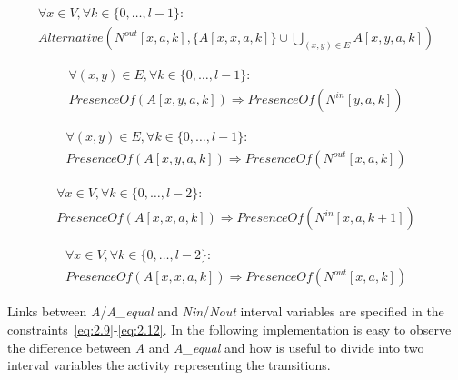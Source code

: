 \documentclass[12pt, a4paper, hidelinks]{article}
\numberwithin{equation}{section}
\begin{document}
\begin{description}\label{eq:equation_set_2.3}
\item \begin{equation}\begin{split} \forall x \in V, \forall k \in \{0,\dots,l-1\}: \\ Alternative(N^{out}[x,a,k], \{A[x,x,a,k]\} \cup \bigcup_{(x,y) \in E} A[x,y,a,k]) \end{split}\label{eq:2.8}\end{equation}
\item \begin{equation}\begin{split} \forall (x,y) \in E, \forall k \in \{0,\dots,l-1\}: \\ PresenceOf(A[x,y,a,k]) \Rightarrow PresenceOf(N^{in}[y,a,k]) \end{split}\label{eq:2.9}\end{equation}
\item \begin{equation}\begin{split} \forall (x,y) \in E, \forall k \in \{0,\dots,l-1\}: \\ PresenceOf(A[x,y,a,k]) \Rightarrow PresenceOf(N^{out}[x,a,k]) \end{split}\label{eq:2.10}\end{equation}
\item \begin{equation}\begin{split} \forall x \in V, \forall k \in \{0,\dots,l-2\}: \\ PresenceOf(A[x,x,a,k]) \Rightarrow PresenceOf(N^{in}[x,a,k+1]) \end{split}\label{eq:2.11}\end{equation}
\item \begin{equation}\begin{split} \forall x \in V, \forall k \in \{0,\dots,l-2\}: \\ PresenceOf(A[x,x,a,k]) \Rightarrow PresenceOf(N^{out}[x,a,k]) \end{split}\label{eq:2.12}\end{equation}
\end{description}

Links between \textit{A}/\textit{A\_equal} and \textit{Nin}/\textit{Nout} interval variables are specified in the constraints~\ref{eq:2.9}-\ref{eq:2.12}.
In the following implementation is easy to observe the difference between \textit{A} and \textit{A\_equal} and how is useful to divide into two interval variables the activity representing the transitions.
\end{document}
